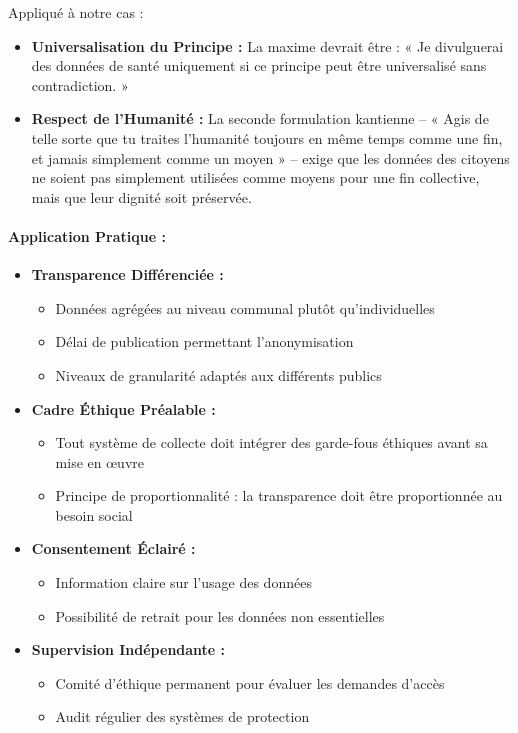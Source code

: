 \documentclass[12pt]{article}
\begin{document}
Appliqué à notre cas :

\begin{itemize}
\item \textbf{Universalisation du Principe :} La maxime devrait être : « Je divulguerai des données de santé uniquement si ce principe peut être universalisé sans contradiction. »
\item \textbf{Respect de l'Humanité :} La seconde formulation kantienne -- « Agis de telle sorte que tu traites l'humanité toujours en même temps comme une fin, et jamais simplement comme un moyen » -- exige que les données des citoyens ne soient pas simplement utilisées comme moyens pour une fin collective, mais que leur dignité soit préservée.
\end{itemize}

\paragraph{Application Pratique :}

\begin{itemize}
\item \textbf{Transparence Différenciée :}
  \begin{itemize}
  \item Données agrégées au niveau communal plutôt qu'individuelles
  \item Délai de publication permettant l'anonymisation
  \item Niveaux de granularité adaptés aux différents publics
  \end{itemize}
  
\item \textbf{Cadre Éthique Préalable :}
  \begin{itemize}
  \item Tout système de collecte doit intégrer des garde-fous éthiques avant sa mise en œuvre
  \item Principe de proportionnalité : la transparence doit être proportionnée au besoin social
  \end{itemize}
  
\item \textbf{Consentement Éclairé :}
  \begin{itemize}
  \item Information claire sur l'usage des données
  \item Possibilité de retrait pour les données non essentielles
  \end{itemize}
  
\item \textbf{Supervision Indépendante :}
  \begin{itemize}
  \item Comité d'éthique permanent pour évaluer les demandes d'accès
  \item Audit régulier des systèmes de protection
  \end{itemize}
\end{itemize}
\end{document}
